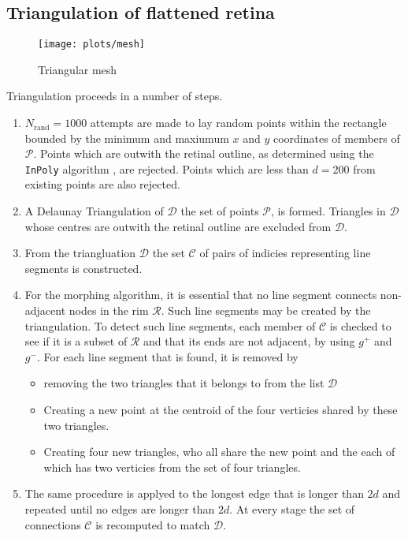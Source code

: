\documentclass{article}
\begin{document}

\subsection{Triangulation of flattened retina}
\label{fold-sphere:sec:triang-flatt-retina}

\begin{figure}[tp]
  \centering
  \texttt{[image: plots/mesh]}
  \caption{Triangular mesh}
  \label{fold-sphere:fig:mesh}
\end{figure}

Triangulation proceeds in a number of steps. 
\begin{enumerate}
\item $N_\mathrm{rand}=1000$ attempts are made to lay random points
  within the rectangle bounded by the minimum and maxiumum $x$ and $y$
  coordinates of members of $\mathcal{P}$.  Points which are outwith
  the retinal outline, as determined using the \texttt{InPoly}
  algorithm \citep{ORou98comp}, are rejected. Points which are less
  than $d=200$ from existing points are also rejected.
\item A Delaunay Triangulation of $\mathcal{D}$ the set of points
  $\mathcal{P}$, is formed. Triangles in $\mathcal{D}$ whose centres
  are outwith the retinal outline are excluded from $\mathcal{D}$.
\item From the triangluation $\mathcal{D}$ the set $\mathcal{C}$ of pairs of
  indicies representing line segments is constructed.
\item For the morphing algorithm, it is essential that no line segment
  connects non-adjacent nodes in the rim $\mathcal{R}$. Such line
  segments may be created by the triangulation. To detect such line
  segments, each member of $\mathcal{C}$ is checked to see if it is a
  subset of $\mathcal{R}$ and that its ends are not adjacent, by
  using $g^+$ and $g^-$. For each line segment that is found, it is
  removed by
  \begin{itemize}
  \item removing the two triangles that it belongs to from the list
    $\mathcal{D}$
  \item Creating a new point at the centroid of the four verticies
    shared by these two triangles.
  \item Creating four new triangles, who all share the new point and
    the each of which has two verticies from the set of four
    triangles.
  \end{itemize}
\item The same procedure is applyed to the longest edge that is longer
  than $2d$ and repeated until no edges are longer than $2d$. At every
  stage the set of connections $\mathcal{C}$ is recomputed to match
  $\mathcal{D}$.
\end{enumerate}
\end{document}
